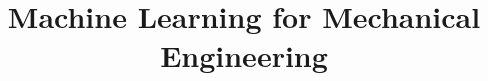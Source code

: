 \documentclass[xcolor=dvipsnames,compress,t,pdf,notes]{beamer}
\title[\insertframenumber /\inserttotalframenumber]{Machine Learning for Mechanical Engineering}
\begin{document}
	\begin{frame}
	\titlepage
	\end{frame}
	
	\newpage 
	
	\newpage 
	
	\newpage
	
\end{document}
